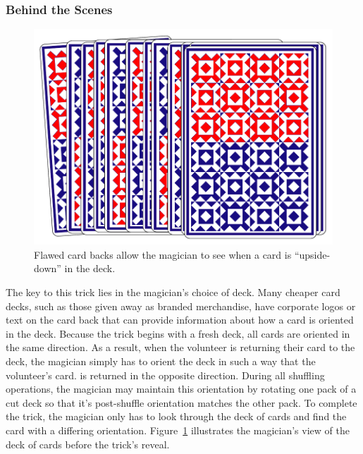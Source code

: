 \subsubsection{Behind the Scenes}

\begin{figure}[H]
\centering
\includegraphics[scale=.7]{images/Trick2}
\caption{Flawed card backs allow the magician to see when a card is
  ``upside-down'' in the deck.}
\label{fig:trick2}
\end{figure}

The key to this trick lies in the magician's choice of deck.  Many cheaper card
decks, such as those given away as branded merchandise,
have corporate logos or
text on the card back that can 
provide information about how a card is oriented in the deck.  Because the trick
begins with a fresh deck, all cards are oriented in the same direction.  As a
result, when the volunteer is returning their card to the deck, the magician
simply has to orient the deck in such a way that the volunteer's card. is returned
in the opposite direction. During all shuffling
operations, the magician may maintain this orientation by rotating one pack of a
cut deck so that it's post-shuffle orientation matches the other pack.
To complete the trick, the magician only has to look through the deck of cards
and find the card with a differing orientation.  Figure~\ref{fig:trick2}
illustrates the magician's view of the deck of cards before the trick's
reveal.

%

